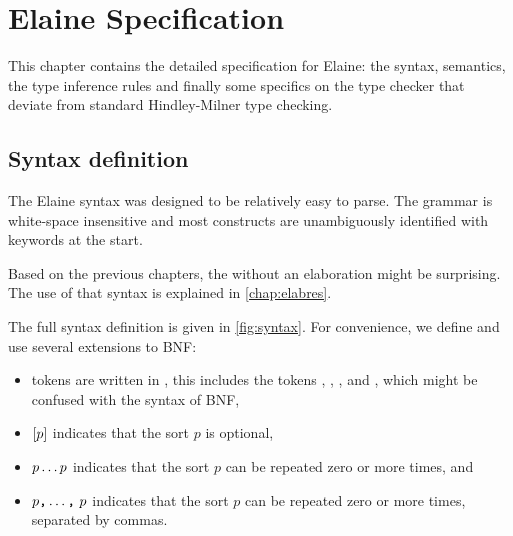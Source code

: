 \chapter{Elaine Specification}\label{chap:spec}


This chapter contains the detailed specification for Elaine: the syntax, semantics, the type inference rules and finally some specifics on the type checker that deviate from standard Hindley-Milner type checking.

\section{Syntax definition}\label{sec:syntax}

The Elaine syntax was designed to be relatively easy to parse. The grammar is white-space insensitive and most constructs are unambiguously identified with keywords at the start.

Based on the previous chapters, the  without an elaboration might be surprising. The use of that syntax is explained in \cref{chap:elabres}.

The full syntax definition is given in \cref{fig:syntax}. For convenience, we define and use several extensions to BNF:
\begin{itemize}
    \item tokens are written in , this includes the tokens \tok{[]}, \tok{<>}, \tok{|}, and \tok{!}, which might be confused with the syntax of BNF,
    \item $[p]$ indicates that the sort $p$ is optional,
    \item $p \dots p$ indicates that the sort $p$ can be repeated zero or more times, and
    \item $p\text{\texttt{,}} \dots \text{\texttt{,}}\ p$ indicates that the sort $p$ can be repeated zero or more times, separated by commas.
\end{itemize}

